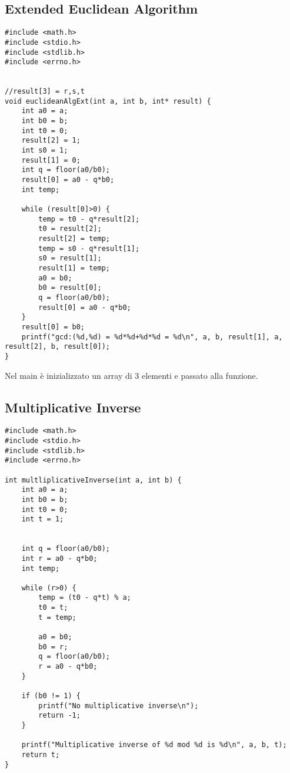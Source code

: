 \documentclass{article}
\begin{document}
\subsection{Extended Euclidean Algorithm}
\begin{lstlisting}[style=CStyle]
#include <math.h>
#include <stdio.h>
#include <stdlib.h>
#include <errno.h>


//result[3] = r,s,t
void euclideanAlgExt(int a, int b, int* result) {
    int a0 = a;
    int b0 = b;
    int t0 = 0;
    result[2] = 1;
    int s0 = 1;
    result[1] = 0;
    int q = floor(a0/b0);
    result[0] = a0 - q*b0;
    int temp;

    while (result[0]>0) {
        temp = t0 - q*result[2];
        t0 = result[2];
        result[2] = temp;
        temp = s0 - q*result[1];
        s0 = result[1];
        result[1] = temp;
        a0 = b0;
        b0 = result[0];
        q = floor(a0/b0);
        result[0] = a0 - q*b0;
    }
    result[0] = b0;
    printf("gcd:(%d,%d) = %d*%d+%d*%d = %d\n", a, b, result[1], a, result[2], b, result[0]);
}

\end{lstlisting}
Nel main \`{e} inizializzato un array di 3 elementi e passato alla funzione.

\subsection{Multiplicative Inverse}
\begin{lstlisting}[style=CStyle]
#include <math.h>
#include <stdio.h>
#include <stdlib.h>
#include <errno.h>

int multliplicativeInverse(int a, int b) {
    int a0 = a;
    int b0 = b;
    int t0 = 0;
    int t = 1;
    
    
    int q = floor(a0/b0);
    int r = a0 - q*b0;
    int temp;

    while (r>0) {
        temp = (t0 - q*t) % a;
        t0 = t;
        t = temp;
    
        a0 = b0;
        b0 = r;
        q = floor(a0/b0);
        r = a0 - q*b0;
    }

    if (b0 != 1) {
        printf("No multiplicative inverse\n");
        return -1;
    }

    printf("Multiplicative inverse of %d mod %d is %d\n", a, b, t);
    return t;
}

\end{lstlisting}
\end{document}
